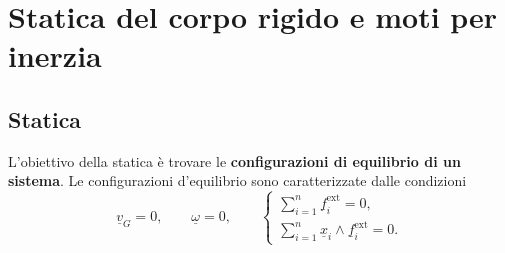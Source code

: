 \chapter{Statica del corpo rigido e moti per inerzia}
\section{Statica}

L'obiettivo della statica è trovare le \textbf{configurazioni di equilibrio di un sistema}.
Le configurazioni d'equilibrio sono caratterizzate dalle condizioni
\[
\underline{v}_G = 0,
\qquad
\underline{\omega} = 0,
\qquad
\begin{cases}
\displaystyle \sum_{i=1}^{n} \underline{f}_i^{\mathrm{ext}} = 0, \\[1ex]
\displaystyle \sum_{i=1}^{n} \underline{x}_i \wedge \underline{f}_i^{\mathrm{ext}} = 0.
\end{cases}
\]

